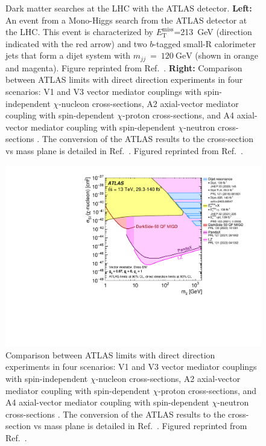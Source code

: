 \begin{figure}[!ht]
\begin{subfigure}{0.56\textwidth}
         \caption[Comparison between ATLAS limits with direct direction experiments in four scenarios]{}
         \label{fig:DMOverview/ATLASDMSearch}
     \end{subfigure}
     \caption{Dark matter searches at the LHC with the ATLAS detector. \textbf{Left:} An event from a Mono-Higgs search from the ATLAS detector at the LHC. This event is characterized by $E^{\text{miss}}_\text{T}$=213~GeV (direction indicated with the red arrow) and two $b$-tagged small-R calorimeter jets that form a dijet system with $m_{jj}~=~120~\text{GeV}$ (shown in orange and magenta). Figure reprinted from Ref.~\cite{ATLAS:2016btj}. \textbf{Right:} Comparison between ATLAS limits with direct direction experiments in four scenarios: V1 and V3 vector mediator couplings with spin-independent $\chi$-nucleon cross-sections, A2 axial-vector mediator coupling with spin-dependent $\chi$-proton cross-sections, and A4 axial-vector mediator coupling with spin-dependent $\chi$-neutron cross-sections \cite{ATLAS:2024kpy}. The conversion of the ATLAS results to the cross-section vs mass plane is detailed in Ref.~\cite{Boveia:2016mrp}. Figured reprinted from Ref.~\cite{ATLAS:2024kpy}.}
     \label{fig:DMOverview/ColliderTwoPanel}
\end{figure}

\iffalse
\begin{figure}[h!]
    \centering
    \includegraphics[width=0.7\linewidth]{figures/DMOverview/ATLASDMSearch.pdf}
    \caption{Comparison between ATLAS limits with direct direction experiments in four scenarios: V1 and V3 vector mediator couplings with spin-independent $\chi$-nucleon cross-sections, A2 axial-vector mediator coupling with spin-dependent $\chi$-proton cross-sections, and A4 axial-vector mediator coupling with spin-dependent $\chi$-neutron cross-sections \cite{ATLAS:2024kpy}. 
    The conversion of the ATLAS results to the cross-section vs mass plane is detailed in Ref.~\cite{Boveia:2016mrp}. Figured reprinted from Ref.~\cite{ATLAS:2024kpy}.}
    \label{fig:DMOverview/ATLASDMSearch}
\end{figure}

